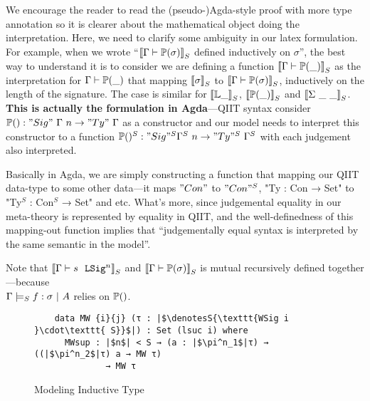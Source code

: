 We encourage the reader to read the (pseudo-)Agda-style proof with more type annotation so it is clearer about the mathematical object doing the interpretation. Here, we need to clarify some ambiguity in our latex formulation. For example, when we wrote ``$\denotesS{\goodType{\Gm}{\TyTkg {\sigma}}{}}$ defined inductively on ${\sigma}$'', the best way to understand it is to consider we are defining a function $\denotesS{\goodType{\Gm}{\TyTkg {\_}}{}}$ as the interpretation for $\goodType{\Gm}{\TyTkg {\_}}{}$ that mapping $\denotesS{\sigma}$ to $\denotesS{\goodType{\Gm}{\TyTkg {\sigma}}{}}$, inductively on the length of the signature. The case is similar for $\denotesS{\cL \_}$, $\denotesS{\Tkg {\_}}$ and  $\denotesS{\Sigma \ \_ \ \_}$. \textbf{This is actually the formulation in Agda}---QIIT syntax consider $\TyTkg{} : "Sig"~\Gm~n \to "Ty"~\Gm$ as a constructor and our model needs to interpret this constructor to a function $\TyTkg{}^S : "Sig"^S \Gm^S~n \to "Ty"^S~\Gm^S$ with each judgement also interpreted. 

Basically in Agda, we are simply constructing a function that mapping our QIIT data-type to some other data---it maps $"Con"$ to $"Con"^S$, "Ty : Con → Set" to "Ty$^S$ : Con$^S$ → Set" and etc. What's more, since judgemental equality in our meta-theory is represented by equality in QIIT, and the well-definedness of this mapping-out function implies that ``judgementally equal syntax is interpreted by the same semantic in the model''. 

Note that $\denotesS{\goodSig{\Gm}{s}{n}}$ and $\denotesS{\goodType{\Gm}{\TyTkg{\sigma}}{i}}$ is mutual recursively defined together---because \\ $\goodSealS{\Gm}{f}{\sigma}{A}$ relies on $\TyTkg{}$. 

\begin{figure}[!htb]
  \centering
\begin{minipage}{0.8\linewidth}
  \begin{verbatim}
    data MW {i}{j} (τ : |$\denotesS{\texttt{WSig i }\cdot\texttt{ S}}$|) : Set (lsuc i) where
      MWsup : |$n$| < S → (a : |$\pi^n_1$|τ) → ((|$\pi^n_2$|τ) a → MW τ) 
              → MW τ
      \end{verbatim}
\end{minipage}
\caption{Modeling Inductive Type}\label{fig:model-ind-type}
\end{figure}

